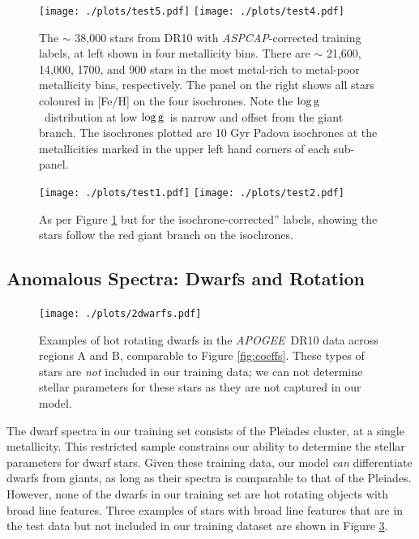 \documentclass[12pt, preprint]{aastex}
\newcommand{\logg}{\mbox{$\rm \log g$}}
\newcommand{\apogee}{\textsl{APOGEE}}
\newcommand{\aspcap}{\textsl{ASPCAP}}
\begin{document}
\begin{figure}[!h]
\centering
  \texttt{[image: ./plots/test5.pdf]}
  \hspace{-20pt}
    \texttt{[image: ./plots/test4.pdf]}
\caption{The $\sim$ 38,000 stars from DR10 with \aspcap-corrected training labels, at left shown in four metallicity bins. There are $\sim$ 21,600, 14,000, 1700, and 900 stars in the most metal-rich to metal-poor metallicity bins, respectively. The panel on the right shows all stars coloured in [Fe/H] on the four isochrones. Note the \logg\ distribution at low \logg\ is narrow and offset from the giant branch. The isochrones plotted are 10 Gyr Padova isochrones at the metallicities marked in the upper left hand corners of each sub-panel.}
\label{fig:iso}
\end{figure}


\begin{figure}[!h]
\centering

      \texttt{[image: ./plots/test1.pdf]}
  \hspace{-20pt}
    \texttt{[image: ./plots/test2.pdf]}
\caption{As per Figure \ref{fig:iso} but for the isochrone-corrected'' labels, showing the stars follow the red giant branch on the isochrones.}
\label{fig:iso2}
\end{figure}



\subsection{Anomalous Spectra: Dwarfs and Rotation}

  \begin{figure}[!h]
   \centering
 \texttt{[image: ./plots/2dwarfs.pdf]}
  \caption{Examples of hot rotating dwarfs in the \apogee\ DR10 data across regions A and B, comparable to Figure \ref{fig:coeffs}. These types of stars are \textit{not} included in our training data; we can not determine stellar parameters for these stars as they are not captured in our model.}
\label{fig:dwarfs}
\end{figure}


The dwarf spectra in our training set consists of the Pleiades cluster, at a single metallicity. This restricted sample constrains our ability to determine the stellar parameters for dwarf stars. Given these training data, our model \textit{can} differentiate dwarfs from giants, as long as their spectra is comparable to that of the Pleiades. However, none of the dwarfs in our training set are hot rotating objects with broad line features. Three examples of stars with broad line features that are in the test data but not included in our training dataset are shown in Figure \ref{fig:dwarfs}.
\end{document}
